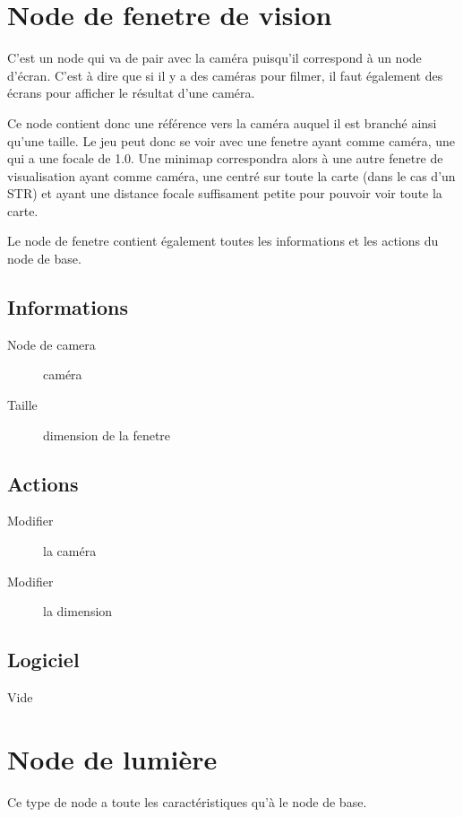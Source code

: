 \documentclass[11pt, a4paper]{article}
\begin{document}
\section{Node de fenetre de vision}
C'est un node qui va de pair avec la caméra puisqu'il correspond à un node d'écran.
C'est à dire que si il y a des caméras pour filmer, il faut également des écrans pour afficher le résultat d'une caméra.

Ce node contient donc une référence vers la caméra auquel il est branché ainsi qu'une taille.
Le jeu peut donc se voir avec une fenetre ayant comme caméra, une qui a une focale de 1.0. Une minimap correspondra alors à une autre fenetre de visualisation ayant comme caméra, une centré sur toute la carte (dans le cas d'un STR) et ayant une distance focale suffisament petite pour pouvoir voir toute la carte.

Le node de fenetre contient également toutes les informations et les actions du node de base.

\subsection{Informations}
\begin{description}
\item[Node de camera] caméra
\item[Taille] dimension de la fenetre
\end{description}

\subsection{Actions}
\begin{description}
\item[Modifier] la caméra
\item[Modifier] la dimension
\end{description}

\subsection{Logiciel}
Vide

\section{Node de lumière}
Ce type de node a toute les caractéristiques qu'à le node de base.
\end{document}
